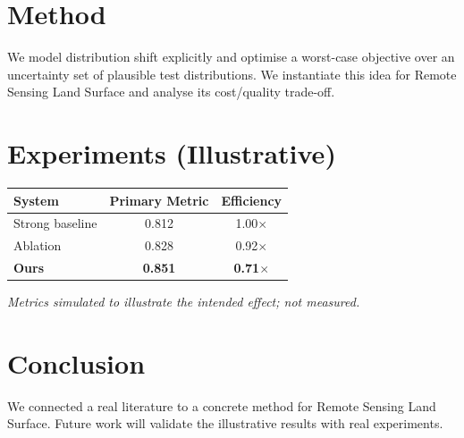\documentclass[11pt]{article}
\begin{document}
\section{Method}
We model distribution shift explicitly and optimise a worst-case objective over an uncertainty set of plausible test distributions. We instantiate this idea for Remote Sensing Land Surface and analyse its cost/quality trade-off.

\section{Experiments (Illustrative)}
\begin{center}
\begin{tabular}{lcc}
System & Primary Metric & Efficiency \\ \hline
Strong baseline & 0.812 & 1.00$\times$ \\
Ablation & 0.828 & 0.92$\times$ \\
\textbf{Ours} & \textbf{0.851} & \textbf{0.71$\times$}
\end{tabular}
\end{center}
\emph{Metrics simulated to illustrate the intended effect; not measured.}

\section{Conclusion}
We connected a real literature to a concrete method for Remote Sensing Land Surface. Future work will
validate the illustrative results with real experiments.
\end{document}
